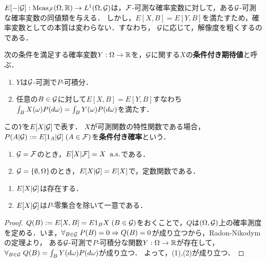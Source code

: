 \documentclass[uplatex,dvipdfmx]{jsreport}
\begin{document}
\begin{tcolorbox}[colframe=ForestGreen, colback=ForestGreen!10!white,breakable,colbacktitle=ForestGreen!40!white,coltitle=black,fonttitle=\bfseries\sffamily,
title=]
    $E[-|\mathcal{G}]:\mathrm{Meas}_{\mathcal{F}}(\Omega,\mathbb{R})\to L^1(\Omega,\mathcal{G})$は，$\mathcal{F}$-可測な確率変数に対して，ある$\mathcal{G}$-可測な確率変数の同値類を与える．
    しかし，$E[X,B]=E[Y,B]$を満たすため，確率変数としての本質は変わらない．すなわち，
    $\mathcal{G}$に応じて，解像度を粗くするのである．
\end{tcolorbox}

\begin{definition}
    次の条件を満足する確率変数$Y:\Omega\to\mathbb{R}$を，$\mathcal{G}$に関する$X$の\textbf{条件付き期待値}と呼ぶ．
    \begin{enumerate}
        \item $Y$は$\mathcal{G}$-可測で$P$-可積分．
        \item 任意の$B\in\mathcal{G}$に対して$E[X,B]=E[Y,B]$すなわち$\int_BX(\omega)P(d\omega)=\int_BY(\omega)P(d\omega)$を満たす．
    \end{enumerate}
    この$Y$を$E[X|\mathcal{G}]$で表す．
    $X$が可測関数の特性関数である場合，$P(A|\mathcal{G}):=E[1_A|\mathcal{G}]\;(A\in\mathcal{F})$を\textbf{条件付き確率}という．
\end{definition}

\begin{example}[自明な例]\mbox{}
    \begin{enumerate}
        \item $\mathcal{G}=\mathcal{F}$のとき，$E[X|\mathcal{F}]=X\;\;\mathrm{a.s.}$である．
        \item $\mathcal{G}=\{\emptyset,\Omega\}$のとき，$E[X|\mathcal{G}]=E[X]$で，定数関数である．
    \end{enumerate}
\end{example}

\begin{lemma}\mbox{}
    \begin{enumerate}
        \item $E[X|\mathcal{G}]$は存在する．
        \item $E[X|\mathcal{G}]$は$P$-零集合を除いて一意である．
    \end{enumerate}
\end{lemma}
\begin{proof}
    $Q(B):=E[X,B]=E{1_BX}\;(B\in\mathcal{G})$をおくことで，$Q$は$(\Omega,\mathcal{G})$上の確率測度を定める．いま，$\forall_{B\in\mathcal{G}}\;P(B)=0\Rightarrow Q(B)=0$が成り立つから，Radon-Nikodymの定理より，
    ある$\mathcal{G}$-可測で$P$-可積分な関数$Y:\Omega\to\mathbb{R}$が存在して，$\forall_{B\in\mathcal{G}}\;Q(B)=\int_BY(d\omega)P(d\omega)$が成り立つ．
    よって，(1),(2)が成り立つ．
\end{proof}
\end{document}
